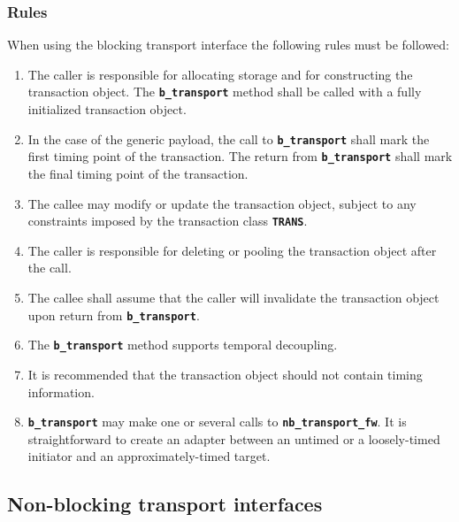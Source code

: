 {\subsubsection{Rules}
When using the blocking transport interface the following rules must be followed:
\begin{enumerate}
	\item The caller is responsible for allocating storage and for constructing the transaction object. 
	The \texttt{\textbf{b\_transport}} method shall be called with a fully initialized transaction object.
	\item In the case of the generic payload, the call to \texttt{\textbf{b\_transport}} shall mark the first timing point of the transaction.
	The return from \texttt{\textbf{b\_transport}} shall mark the final timing point of the transaction.
	\item The callee may modify or update the transaction object, subject to any constraints imposed by the transaction class \texttt{\textbf{TRANS}}.
	\item The caller is responsible for deleting or pooling the transaction object after the call.
	\item The callee shall assume that the caller will invalidate the transaction object upon return from \texttt{\textbf{b\_transport}}.
	\item The \texttt{\textbf{b\_transport}} method supports temporal decoupling.
	\item It is recommended that the transaction object should not contain timing information. 
	\item \texttt{\textbf{b\_transport}} may make one or several calls to \texttt{\textbf{nb\_transport\_fw}}. 
	It is straightforward to create an adapter between an untimed or a loosely-timed initiator and an approximately-timed target.
\end{enumerate}
}

\subsection{Non-blocking transport interfaces}

